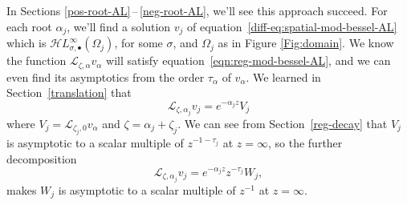 \documentclass{article}
\newcommand{\singexp}[2]{\mathcal{H}L^\infty_{#1, #2}}
\newcommand{\singexpalg}[1]{\singexp{#1}{\bullet}}
\theoremstyle{definition}
\newcommand{\fracderiv}[3]{\partial^{#1}_{#2, #3}}
\newcommand{\laplace}{\mathcal{L}}
\theoremstyle{plain}
\begin{document}
In Sections \ref{pos-root-AL}\,--\,\ref{neg-root-AL}, we'll see this approach succeed. For each root $\alpha_j$, we'll find a solution $v_j$ of equation~\eqref{diff-eq:spatial-mod-bessel-AL} which is $\singexpalg{\sigma}(\Omega_j)$, for some $\sigma$, and $\Omega_j$ as in Figure \ref{Fig:domain}. We know the function $\laplace_{\zeta, \alpha} v_\alpha$ will satisfy equation~\eqref{eqn:reg-mod-bessel-AL}, and we can even find its asymptotics from the order $\tau_\alpha$ of $v_\alpha$. We learned in Section~\ref{translation} that
\[ \laplace_{\zeta, \alpha_j} v_j = e^{-\alpha_j z} V_j \]
where $V_j = \laplace_{\zeta_j, 0} v_\alpha$ and $\zeta = \alpha_j + \zeta_j$. We can see from Section~\ref{reg-decay} that $V_j$ is asymptotic to a scalar multiple of $z^{-1 - \tau_j}$ at $z = \infty$, so the further decomposition
\[ \laplace_{\zeta, \alpha_j} v_j = e^{-\alpha_j z} z^{-\tau_j} W_j, \]
makes $W_j$ is asymptotic to a scalar multiple of $z^{-1}$ at $z = \infty$.
\end{document}
